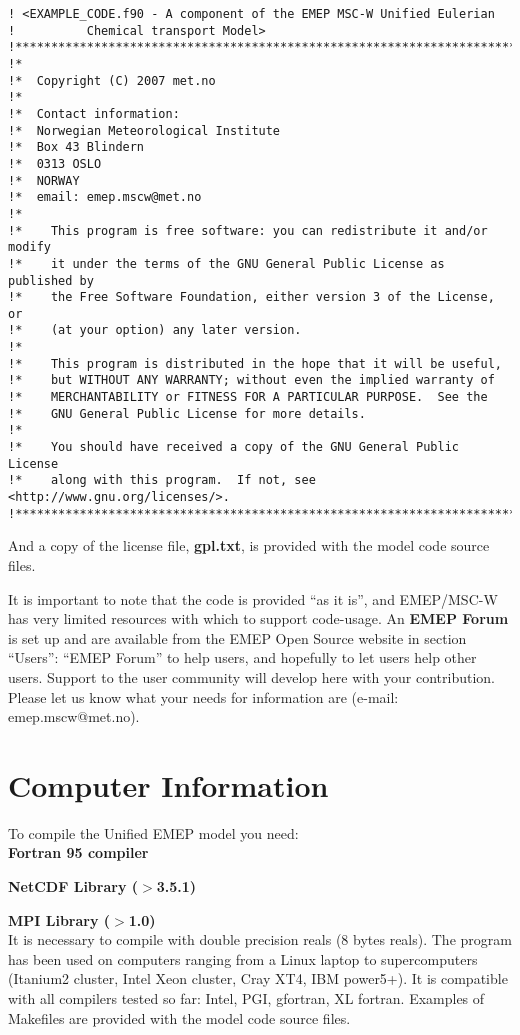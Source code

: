\begin{verbatim}
! <EXAMPLE_CODE.f90 - A component of the EMEP MSC-W Unified Eulerian
!          Chemical transport Model>
!*****************************************************************************!
!*
!*  Copyright (C) 2007 met.no
!*
!*  Contact information:
!*  Norwegian Meteorological Institute
!*  Box 43 Blindern
!*  0313 OSLO
!*  NORWAY
!*  email: emep.mscw@met.no
!*
!*    This program is free software: you can redistribute it and/or modify
!*    it under the terms of the GNU General Public License as published by
!*    the Free Software Foundation, either version 3 of the License, or
!*    (at your option) any later version.
!*
!*    This program is distributed in the hope that it will be useful,
!*    but WITHOUT ANY WARRANTY; without even the implied warranty of
!*    MERCHANTABILITY or FITNESS FOR A PARTICULAR PURPOSE.  See the
!*    GNU General Public License for more details.
!*
!*    You should have received a copy of the GNU General Public License
!*    along with this program.  If not, see <http://www.gnu.org/licenses/>.
!*****************************************************************************!
\end{verbatim}

And a copy of the license file, {\bf gpl.txt}, is provided with the
model code source files.

\noindent It is important to note that the code is provided ``as it is'', 
and EMEP/MSC-W has very limited resources with which to support
code-usage. An {\bf EMEP Forum} is set up and are available from the
EMEP Open Source website in section ``Users'': ``EMEP Forum''
to help users, and hopefully to let users help other users.
Support to the user community will develop here with your
contribution. 
Please let us know what your needs for information are 
(e-mail: emep.mscw@met.no).


\section{Computer Information}
\label{sec:compinf}

To compile the Unified EMEP model you need:\\

\textbf{Fortran 95 compiler}

\textbf{NetCDF Library ($>$3.5.1)}

\textbf{MPI Library ($>$1.0)}\\

It is necessary to compile with double precision reals (8 bytes
reals). The program has been used on computers ranging from a Linux laptop to supercomputers 
(Itanium2 cluster, Intel Xeon cluster, Cray XT4, IBM power5+). It is compatible with all 
compilers tested so far:  Intel, PGI, gfortran, XL fortran. Examples of Makefiles are provided 
with the model code source files.

